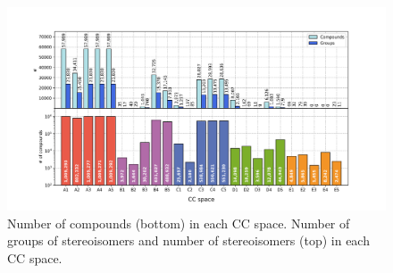 \setcounter{section}{3} %
\setcounter{figure}{0}  %



\begin{figure}[htbp]
  \centering
  \includegraphics[width=1\linewidth]{figures/Stereoisomers/Supplementary/FigS1.png}
  \caption{Number of compounds (bottom) in each CC space. Number of groups of stereoisomers and number of stereoisomers (top) in each CC space.}
  \label{Stereoisomers_FigS1}
\end{figure}



